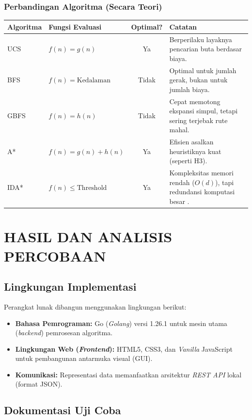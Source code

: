 \documentclass[11pt,a4paper]{article}
\begin{document}
\subsubsection{Perbandingan Algoritma (Secara Teori)}
\begin{table}[H]
\centering
\begin{tabular}{p{2cm} p{3.5cm} c p{6cm}}
\toprule
\textbf{Algoritma} & \textbf{Fungsi Evaluasi} & \textbf{Optimal?} & \textbf{Catatan} \\
\midrule
UCS  & $f(n) = g(n)$ & Ya & Berperilaku layaknya pencarian buta berdasar biaya.\\
BFS  & $f(n) = \text{Kedalaman}$ & Tidak & Optimal untuk jumlah gerak, bukan untuk jumlah biaya.\\
GBFS & $f(n) = h(n)$ & Tidak & Cepat memotong ekspansi simpul, tetapi sering terjebak rute mahal.\\
A*   & $f(n) = g(n) + h(n)$ & Ya & Efisien asalkan heuristiknya kuat (seperti H3).\\
IDA* & $f(n) \leq \text{Threshold}$ & Ya & Kompleksitas memori rendah ($O(d)$), tapi redundansi komputasi besar \cite{Korf}.\\
\bottomrule
\end{tabular}
\end{table}

\section{HASIL DAN ANALISIS PERCOBAAN}

\subsection{Lingkungan Implementasi}
Perangkat lunak dibangun menggunakan lingkungan berikut:
\begin{itemize}[noitemsep]
    \item \textbf{Bahasa Pemrograman:} Go (\textit{Golang}) versi 1.26.1 untuk mesin utama (\textit{backend}) pemrosesan algoritma.
    \item \textbf{Lingkungan Web (\textit{Frontend}):} HTML5, CSS3, dan \textit{Vanilla} JavaScript untuk pembangunan antarmuka visual (GUI).
    \item \textbf{Komunikasi:} Representasi data memanfaatkan arsitektur \textit{REST API} lokal (format JSON).
\end{itemize}

\subsection{Dokumentasi Uji Coba}
\end{document}
